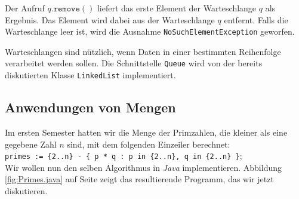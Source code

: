 \begin{enumerate}
\begin{enumerate}
            Der Aufruf $q.\mathtt{remove}()$ liefert das erste Element der Warteschlange $q$ als
            Ergebnis.  Das Element wird dabei aus der Warteschlange $q$ entfernt.  Falls die
            Warteschlange leer ist, wird die Ausnahme \texttt{NoSuchElementException} geworfen.
      \end{enumerate}
      Warteschlangen sind n\"utzlich, wenn Daten in einer bestimmten Reihenfolge verarbeitet
      werden sollen.  Die Schnittstelle \texttt{Queue} wird von der bereits
      diskutierten Klasse \texttt{LinkedList} implementiert.
\end{enumerate}

\subsection{Anwendungen von Mengen}
Im ersten Semester hatten wir die Menge der Primzahlen, die kleiner als eine gegebene Zahl
$n$ sind, mit dem folgenden Einzeiler berechnet:
\\[0.2cm]
\hspace*{1.3cm}
\texttt{primes := \{2..n\} - \{ p * q : p in \{2..n\}, q in \{2..n\} \}};
\\[0.2cm]
Wir wollen nun den selben Algorithmus in \textsl{Java} implementieren.
Abbildung \ref{fig:Primes.java} auf Seite \pageref{fig:Primes.java} zeigt das
resultierende Programm, das wir jetzt diskutieren.

